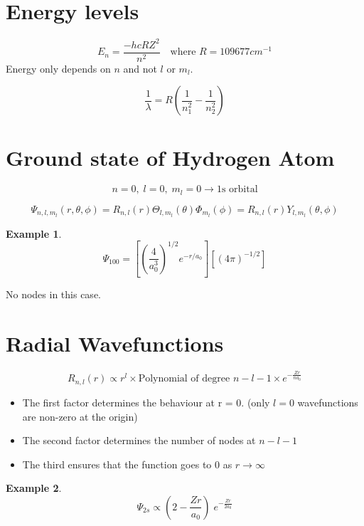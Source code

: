 \documentclass[12pt]{article}
\theoremstyle{definition}
\newtheorem*{example}{Example}
\theoremstyle{definition}
\begin{document}
\section{Energy levels}%
\label{cha:Energy levels}

\[
	E_n = \frac{ -hcRZ^2 }{n^2} \quad \textrm{where $R = 109677cm^{-1}$}
\]
Energy only depends on $n$ and not $l$ or $m_l$.

\[
	\frac{1 }{\lambda } = R \left( \frac{1 }{n_1^2} - \frac{1 }{n_2^2}  \right)
\]


\section{Ground state of Hydrogen Atom}%
\label{sec:Ground state of Hydrogen Atom}

\[
	n = 0,\;l = 0,\;m_l = 0 \rightarrow \textrm{1s orbital}
\]

\[
	\Psi_{n, l, m_l}(r, \theta, \phi) = R_{n, l}(r) \Theta_{l, m_l}(\theta) \Phi_{m_l}(\phi) = R_{n, l}(r) Y_{l, m_l}(\theta, \phi)
\]

\begin{example}
	\[
		\Psi_{100} = \left[ \left( \frac{4}{a_0^3} \right)^{1/2} e^{-r/a_0}  \right] \left[ \left( 4\pi \right)^{-1/2} \right]
	\]
\end{example}

No nodes in this case.

\section{Radial Wavefunctions}%
\label{sec:Radial Wavefunctions}

\[
	R_{n, l}(r) \propto r^l \times \textrm{Polynomial of degree $n-l-1$} \times e^{- \frac{Zr }{na_0} }
\]

\begin{itemize}
	\item The first factor determines the behaviour at r = 0. (only $l = 0$ wavefunctions are non-zero at the origin)
	\item The second factor determines the number of nodes at $n - l - 1$
	\item The third ensures that the function goes to 0 as $r \to \infty$
\end{itemize}

\begin{example}
	\[
		\Psi_{2s} \propto \left( 2 - \frac{Zr}{a_0}  \right)\;e^{ -\frac{Zr}{2a_0} }
	\]
\end{example}
\end{document}
